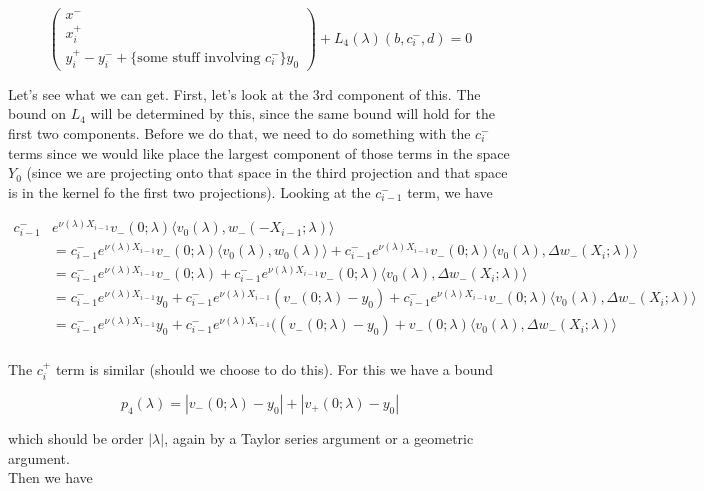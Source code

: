 \documentclass[12pt]{article}
\begin{document}
\begin{enumerate}
\[
\begin{pmatrix}x^- \\ x_i^+ \\ y_i^+ - y_i^- + \text{\{some stuff involving $c_i^-$\} $y_0$} \end{pmatrix}+ L_4(\lambda)(b, c_i^-,d) = 0
\]

Let's see what we can get. First, let's look at the 3rd component of this. The bound on $L_4$ will be determined by this, since the same bound will hold for the first two components. Before we do that, we need to do something with the $c_i^-$ terms since we would like place the largest component of those terms in the space $Y_0$ (since we are projecting onto that space in the third projection and that space is in the kernel fo the first two projections). Looking at the $c_{i-1}^-$ term, we have

\begin{align*}
c_{i-1}^- &e^{\nu(\lambda)X_{i-1}} v_-(0; \lambda) \langle v_0(\lambda), w_-(-X_{i-1}; \lambda) \rangle \\
&= c_{i-1}^- e^{\nu(\lambda)X_{i-1}} v_-(0; \lambda) \langle v_0(\lambda), w_0(\lambda) \rangle + c_{i-1}^- e^{\nu(\lambda)X_{i-1}} v_-(0; \lambda) \langle v_0(\lambda), \Delta w_-(X_i; \lambda) \rangle \\
&= c_{i-1}^- e^{\nu(\lambda)X_{i-1}} v_-(0; \lambda) + c_{i-1}^- e^{\nu(\lambda)X_{i-1}} v_-(0; \lambda) \langle v_0(\lambda), \Delta w_-(X_i; \lambda) \rangle \\
&= c_{i-1}^- e^{\nu(\lambda)X_{i-1}} y_0 +  c_{i-1}^- e^{\nu(\lambda)X_{i-1}} (v_-(0; \lambda) - y_0) + c_{i-1}^- e^{\nu(\lambda)X_{i-1}} v_-(0; \lambda) \langle v_0(\lambda), \Delta w_-(X_i; \lambda) \rangle \\
&= c_{i-1}^- e^{\nu(\lambda)X_{i-1}} y_0 + c_{i-1}^- e^{\nu(\lambda)X_{i-1}}( (v_-(0; \lambda) - y_0) + v_-(0; \lambda) \langle v_0(\lambda), \Delta w_-(X_i; \lambda) \rangle \\
\end{align*} 

The $c_i^+$ term is similar (should we choose to do this). For this we have a bound

\[
p_4(\lambda) = |v_-(0; \lambda) - y_0| + |v_+(0; \lambda) - y_0|
\]

which should be order $|\lambda|$, again by a Taylor series argument or a geometric argument.\\

Then we have


\end{enumerate}
\end{document}
